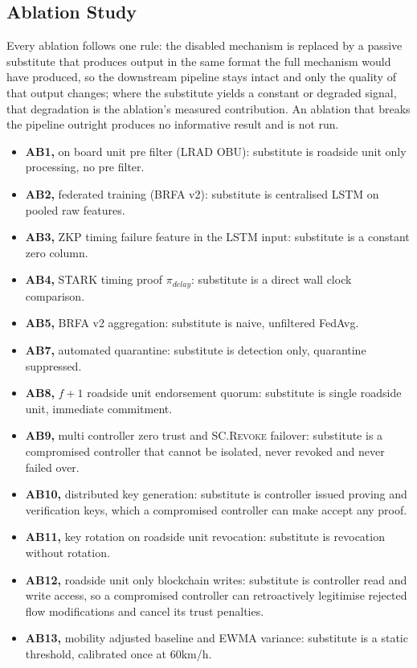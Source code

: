 \documentclass[final,5p,twocolumn]{elsarticle}
\theoremstyle{remark}
\theoremstyle{plain}
\begin{document}
\subsection{Ablation Study}
\label{sec:ablation}

Every ablation follows one rule: the disabled mechanism is replaced by a
passive substitute that produces output in the same format the full
mechanism would have produced, so the downstream pipeline stays intact and
only the quality of that output changes; where the substitute yields a
constant or degraded signal, that degradation is the ablation's measured
contribution. An ablation that breaks the pipeline outright produces no
informative result and is not run.

\begin{itemize}
	\item \textbf{AB1,} on board unit pre filter (LRAD OBU): substitute is roadside unit only processing, no pre filter.
	\item \textbf{AB2,} federated training (BRFA v2): substitute is centralised LSTM on pooled raw features.
	\item \textbf{AB3,} ZKP timing failure feature in the LSTM input: substitute is a constant zero column.
	\item \textbf{AB4,} STARK timing proof $\pi_{delay}$: substitute is a direct wall clock comparison.
	\item \textbf{AB5,} BRFA v2 aggregation: substitute is naive, unfiltered FedAvg.
	\item \textbf{AB7,} automated quarantine: substitute is detection only, quarantine suppressed.
	\item \textbf{AB8,} $f{+}1$ roadside unit endorsement quorum: substitute is single roadside unit, immediate commitment.
	\item \textbf{AB9,} multi controller zero trust and \textsc{SC.Revoke} failover: substitute is a compromised controller that cannot be isolated, never revoked and never failed over.
	\item \textbf{AB10,} distributed key generation: substitute is controller issued proving and verification keys, which a compromised controller can make accept any proof.
	\item \textbf{AB11,} key rotation on roadside unit revocation: substitute is revocation without rotation.
	\item \textbf{AB12,} roadside unit only blockchain writes: substitute is controller read and write access, so a compromised controller can retroactively legitimise rejected flow modifications and cancel its trust penalties.
	\item \textbf{AB13,} mobility adjusted baseline and EWMA variance: substitute is a static threshold, calibrated once at 60km/h.
\end{itemize}
\end{document}
